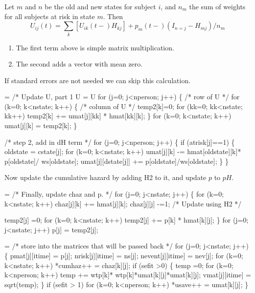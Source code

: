 \documentclass{article}
\begin{document}
Let $m$ and $n$ be the old and new states for subject $i$, and
$n_m$ the sum of weights for all subjects at risk in state $m$.
Then
\begin{equation*}
  U_{ij}(t) = \sum_k \left[ U_{ik}(t-)H_{kj}\right] + p_m(t-)(I_{n=j} - H_{mj})/ n_m
\end{equation*}
\begin{enumerate}
  \item The first term above is simple matrix multiplication.
  \item The second adds a vector with mean zero.
\end{enumerate}
If standard errors are not needed we can skip this calculation.

\begin{nwchunk}
=
 /* Update U, part 1  U = U %
 for (j=0; j<nperson; j++) \{ /* row of U */
         for (k=0; k<nstate; k++) \{ /* column of U */
             temp2[k]=0;
             for (kk=0; kk<nstate; kk++) 
                 temp2[k] += umat[j][kk] * hmat[kk][k];
         \}  
         for (k=0; k<nstate; k++) umat[j][k] = temp2[k];
 \}
 
 /* step 2, add in dH term */
 for (j=0; j<nperson; j++) \{
         if (atrisk[j]==1) \{
         oldstate = cstate[j];
             for (k=0; k<nstate; k++)
                 umat[j][k] -= hmat[oldstate][k]* p[oldstate]/ ws[oldstate];
             umat[j][dstate[j]] += p[oldstate]/ws[oldstate];
         \}
 \}
\end{nwchunk}

Now update the cumulative hazard by adding H2 to it, and 
update $p$ to $pH$.
\begin{nwchunk}
=
 /* Finally, update chaz and p.  */
 for (j=0; j<nstate; j++) \{
     for (k=0; k<nstate; k++) chaz[j][k] += hmat[j][k];
     chaz[j][j] -=1;  /* Update using H2 */
 
     temp2[j] =0;
     for (k=0; k<nstate; k++)
         temp2[j] += p[k] * hmat[k][j];
  \}
 for (j=0; j<nstate; j++) p[j] = temp2[j];
\end{nwchunk}

\begin{nwchunk}
=
 /* store into the matrices that will be passed back */
 for (j=0; j<nstate; j++) \{
     pmat[j][itime] = p[j];
     nrisk[j][itime] = ns[j];
     nevent[j][itime] = nev[j];
     for (k=0; k<nstate; k++) *cumhaz++ = chaz[k][j];
     if (sefit >0) \{
         temp =0;
         for (k=0; k<nperson; k++) 
             temp += wtp[k]* wtp[k]*umat[k][j]*umat[k][j];
         vmat[j][itime] = sqrt(temp);
     \}
     if (sefit > 1)
         for (k=0; k<nperson; k++) *usave++ = umat[k][j];
  \}
\end{nwchunk}
\end{document}
